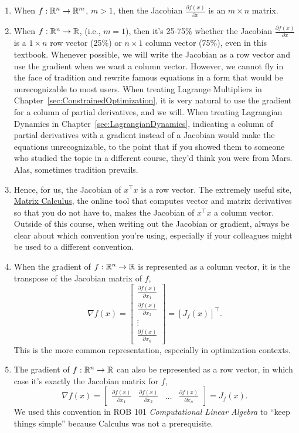 \begin{enumerate}[label=(\roman*)]
    \item When $f:\mathbb R^{n} \to \mathbb R^{m}$, $m > 1$, then the Jacobian $\frac{\partial f(x)}{\partial x}$ is an $m \times n$ matrix.

    \item When $f:\mathbb R^{n} \to \mathbb R$, (i.e., $m =1$), then it's 25-75\% whether the Jacobian $\frac{\partial f(x)}{\partial x}$ is a $1 \times n$ row vector (25\%) or $n \times 1$ column vector (75\%), even in this textbook. Whenever possible, we will write the Jacobian as a row vector and use the gradient when we want a column vector. However, we cannot fly in the face of tradition and rewrite famous equations in a form that would be unrecognizable to most users. When treating Lagrange Multipliers in Chapter~\ref{sec:ConstrainedOptimization}, it is very natural to use the gradient for a column of partial derivatives, and we will. When treating Lagrangian Dynamics in Chapter~\ref{sec:LagrangianDynamics}, indicating a column of partial derivatives with a gradient instead of a Jacobian would make the equations unrecognizable, to the point that if you showed them to someone who studied the topic in a different course, they'd think you were from Mars. Alas, sometimes tradition prevails. 

    \item Hence, for us, the Jacobian of $x^\top x$ is a row vector. The extremely useful site, \href{https://www.matrixcalculus.org/}{Matrix Calculus}, the online tool that computes vector and matrix derivatives so that you do not have to, makes the Jacobian of $x^\top x$ a column vector. Outside of this course, when writing out the Jacobian or gradient, always be clear about which convention you're using, especially if your colleagues might be used to a different convention. 

    \item When the gradient of \( f:\mathbb R^{n} \to \mathbb R\) is represented as a column vector, it is the transpose of the Jacobian matrix of \( f \), 
    $$ \nabla f(x) = \begin{bmatrix}
    \frac{\partial f(x)}{\partial x_1} \\[1em]
    \frac{\partial f(x)}{\partial x_2} \\
    \vdots \\
    \frac{\partial f(x)}{\partial x_n}
    \end{bmatrix} = \left[ J_f(x) \right]^\top.$$
    This is the more common representation, especially in optimization contexts.

    \item The gradient of \( f:\mathbb R^{n} \to \mathbb R \) can also be represented as a row vector, in which case it's exactly the Jacobian matrix for \( f \),
    $$\nabla f(x) = \begin{bmatrix}
    \frac{\partial f(x)}{\partial x_1} & \frac{\partial f(x)}{\partial x_2} & \dots & \frac{\partial f(x)}{\partial x_n}
    \end{bmatrix} = J_f(x). $$
    We used this convention in ROB 101 \textit{Computational Linear Algebra} to ``keep things simple'' because Calculus was not a prerequisite.
\end{enumerate}
